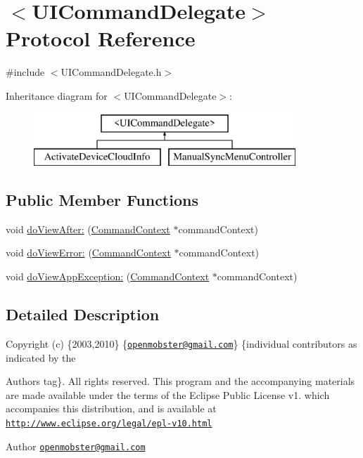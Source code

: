 \hypertarget{protocol_u_i_command_delegate-p}{
\section{$<$\-U\-I\-Command\-Delegate$>$ \-Protocol \-Reference}
\label{protocol_u_i_command_delegate-p}
}


{\ttfamily \#include $<$\-U\-I\-Command\-Delegate.\-h$>$}

\-Inheritance diagram for $<$\-U\-I\-Command\-Delegate$>$\-:\begin{figure}[H]
\begin{center}
\leavevmode
\includegraphics[height=2.000000cm]{protocol_u_i_command_delegate-p}
\end{center}
\end{figure}
\subsection*{\-Public \-Member \-Functions}
\begin{DoxyCompactItemize}
\item 
void \hyperlink{protocol_u_i_command_delegate-p_af12c12d06917a2cedc824890d61ea60a}{do\-View\-After\-:} (\hyperlink{interface_command_context}{\-Command\-Context} $\ast$command\-Context)
\item 
void \hyperlink{protocol_u_i_command_delegate-p_a8837f2cb5bfa7caec4d9dc0485d71cb1}{do\-View\-Error\-:} (\hyperlink{interface_command_context}{\-Command\-Context} $\ast$command\-Context)
\item 
void \hyperlink{protocol_u_i_command_delegate-p_a5eadaca8d36c063d5dba1b282d7b0ac3}{do\-View\-App\-Exception\-:} (\hyperlink{interface_command_context}{\-Command\-Context} $\ast$command\-Context)
\end{DoxyCompactItemize}


\subsection{\-Detailed \-Description}
\-Copyright (c) \{2003,2010\} \{\href{mailto:openmobster@gmail.com}{\tt openmobster@gmail.\-com}\} \{individual contributors as indicated by the \begin{DoxyAuthor}{\-Authors}
tag\}. \-All rights reserved. \-This program and the accompanying materials are made available under the terms of the \-Eclipse \-Public \-License v1. which accompanies this distribution, and is available at \href{http://www.eclipse.org/legal/epl-v10.html}{\tt http\-://www.\-eclipse.\-org/legal/epl-\/v10.\-html}
\end{DoxyAuthor}
\begin{DoxyAuthor}{\-Author}
\href{mailto:openmobster@gmail.com}{\tt openmobster@gmail.\-com} 
\end{DoxyAuthor}


